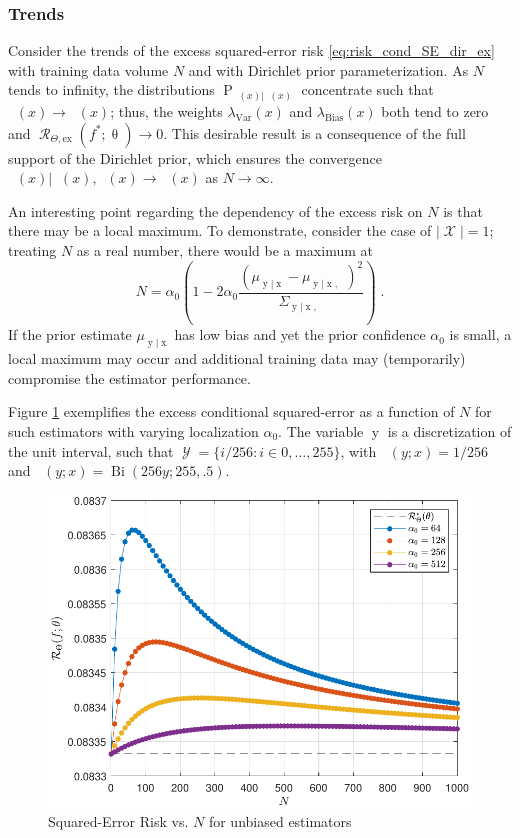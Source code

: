 \documentclass{article}
\DeclareMathOperator{\xrm}{\mathrm{x}}
\DeclareMathOperator{\yrm}{\mathrm{y}}
\DeclareMathOperator{\Prm}{\mathrm{P}}
\DeclareMathOperator{\Xcal}{\mathcal{X}}
\DeclareMathOperator{\Ycal}{\mathcal{Y}}
\DeclareMathOperator{\Rcal}{\mathcal{R}}
\DeclareMathOperator{\Bi}{\mathrm{Bi}}
\DeclareMathOperator{\thetam}{\theta_\text{m}}
\DeclareMathOperator{\upthetam}{\uptheta_\text{m}}
\DeclareMathOperator{\thetac}{\theta_\text{c}}
\DeclareMathOperator{\upthetac}{\uptheta_\text{c}}
\DeclareMathOperator{\uppsim}{\uppsi_\text{m}}
\DeclareMathOperator{\uppsic}{\uppsi_\text{c}}
\DeclareMathOperator{\alphac}{\alpha_\text{c}}
\begin{document}
\subsubsection{Trends}

Consider the trends of the excess squared-error risk \eqref{eq:risk_cond_SE_dir_ex} with training data volume $N$ and with Dirichlet prior parameterization. As $N$ tends to infinity, the distributions $\Prm_{\uppsim(x) | \upthetam(x)}$ concentrate such that $\uppsim(x) \to \thetam(x)$; thus, the weights $\lambda_{\text{Var}}(x)$ and $\lambda_{\text{Bias}}(x)$ both tend to zero and $\Rcal_{\Theta, \mathrm{ex}}(f^* ; \uptheta) \to 0$. This desirable result is a consequence of the full support of the Dirichlet prior, which ensures the convergence $\upthetac(x) | \uppsim(x),\uppsic(x) \to \uppsic(x)$ as $N \to \infty$.

An interesting point regarding the dependency of the excess risk on $N$ is that there may be a local maximum. To demonstrate, consider the case of $|\Xcal| = 1$; treating $N$ as a real number, there would be a maximum at 
\begin{equation}
N = \alpha_0 \left( 1 - 2 \alpha_0 \frac{\left( \mu_{\yrm | \xrm} - \mu_{\yrm | \xrm,\upthetac} \right)^2}{\Sigma_{\yrm | \xrm,\upthetac}} \right) \;.
\end{equation}
If the prior estimate $\mu_{\yrm | \xrm}$ has low bias and yet the prior confidence $\alpha_0$ is small, a local maximum may occur and additional training data may (temporarily) compromise the estimator performance. 

Figure \ref{fig:Risk_cond_SE_Dir_N_leg_a0_unbiased} exemplifies the excess conditional squared-error as a function of $N$ for such estimators with varying localization $\alpha_0$. The variable $\yrm$ is a discretization of the unit interval, such that $\Ycal = \{i/256: i \in 0,\ldots,255\}$, with $\thetac(y;x) = 1/256$ and $\alphac(y;x) = \Bi(256y;255,.5)$.
\begin{figure}
	\centering
	\includegraphics[width=1\linewidth]{Risk_cond_SE_Dir_N_leg_a0_unbiased_SSP.pdf}
	\caption{Squared-Error Risk vs. $N$ for unbiased estimators}
	\label{fig:Risk_cond_SE_Dir_N_leg_a0_unbiased}
\end{figure}
\end{document}

